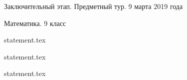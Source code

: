 \documentclass[a4paper,11pt, oneside]{book}
\begin{document}
\vspace{-3mm}
\vspace{-5mm}

\normalsize

\begin{center}
    Заключительный этап. Предметный тур. 9 марта 2019 года
    
    Математика. 9 класс
\end{center}

\parindent=0cm

{statement.tex}

{statement.tex}

{statement.tex}
\end{document}
